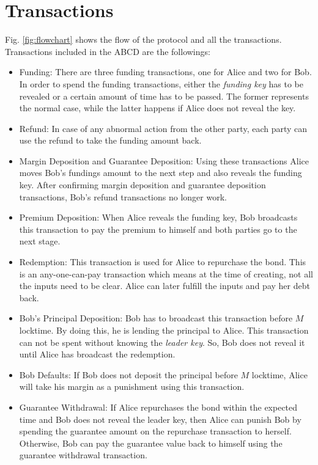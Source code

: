 \documentclass{article}
\begin{document}
\section{Transactions}
Fig. \ref{fig:flowchart} shows the flow of the protocol and all the transactions. Transactions included in the ABCD are the followings:
\begin{itemize}
    \item Funding: There are three funding transactions, one for Alice and two for Bob. In order to spend the funding transactions, either the \textit{funding key} has to be revealed or a certain amount of time has to be passed. The former represents the normal case, while the latter happens if Alice does not reveal the key.
    \item Refund: In case of any abnormal action from the other party, each party can use the refund to take the funding amount back.
    \item Margin Deposition and Guarantee Deposition: Using these transactions Alice moves Bob's fundings amount to the next step and also reveals the funding key. After confirming margin deposition and guarantee deposition transactions, Bob's refund transactions no longer work.
    \item Premium Deposition: When Alice reveals the funding key, Bob broadcasts this transaction to pay the premium to himself and both parties go to the next stage.
    \item Redemption: This transaction is used for Alice to repurchase the bond. This is an any-one-can-pay transaction which means at the time of creating, not all the inputs need to be clear. Alice can later fulfill the inputs and pay her debt back. 
    \item Bob's Principal Deposition: Bob has to broadcast this transaction before $M$ locktime. By doing this, he is lending the principal to Alice. This transaction can not be spent without knowing the \textit{leader key}. So, Bob does not reveal it until Alice has broadcast the redemption.
    \item Bob Defaults: If Bob does not deposit the principal before $M$ locktime, Alice will take his margin as a punishment using this transaction.
    \item Guarantee Withdrawal: If Alice repurchases the bond within the expected time and Bob does not reveal the leader key, then Alice can punish Bob by spending the guarantee amount on the repurchase transaction to herself. Otherwise, Bob can pay the guarantee value back to himself using the guarantee withdrawal transaction.
\end{itemize}
\end{document}
